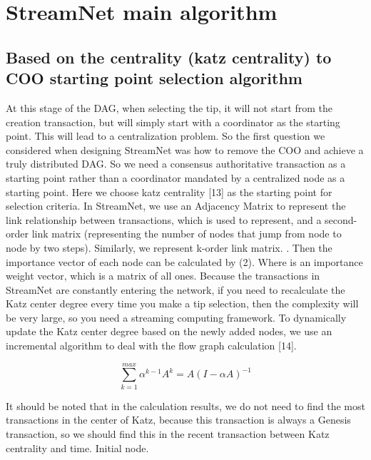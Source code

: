 \documentclass{article}
\begin{document}
\section{StreamNet main algorithm}
\subsection{Based on the centrality (katz centrality) to COO starting point selection algorithm}
At this stage of the DAG, when selecting the tip, it will not start from the creation transaction, but will simply start with a coordinator as the starting point. This will lead to a centralization problem. So the first question we considered when designing StreamNet was how to remove the COO and achieve a truly distributed DAG. So we need a consensus authoritative transaction as a starting point rather than a coordinator mandated by a centralized node as a starting point. Here we choose katz centrality [13] as the starting point for selection criteria. In StreamNet, we use an Adjacency Matrix to represent the link relationship between transactions, which is used to represent, and a second-order link matrix (representing the number of nodes that jump from node to node by two steps). Similarly, we represent k-order link matrix. . Then the importance vector of each node can be calculated by (2). Where is an importance weight vector, which is a matrix of all ones. Because the transactions in StreamNet are constantly entering the network, if you need to recalculate the Katz center degree every time you make a tip selection, then the complexity will be very large, so you need a streaming computing framework. To dynamically update the Katz center degree based on the newly added nodes, we use an incremental algorithm to deal with the flow graph calculation [14].

\begin{equation}
\label{simple_equation}
\sum_{k=1}^{max} \alpha^{k-1}A^{k}=A(I-\alpha A)^{-1}
\end{equation}

It should be noted that in the calculation results, we do not need to find the most transactions in the center of Katz, because this transaction is always a Genesis transaction, so we should find this in the recent transaction between Katz centrality and time. Initial node.
\end{document}
